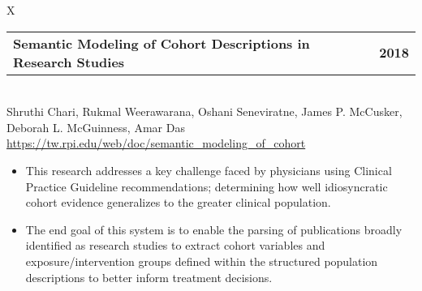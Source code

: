 \documentclass[10pt, letterpaper]{article}
\newcommand{\tabularxwidth}{\textwidth}
\begin{document}
        \begin{minipage}{\tabularxwidth}
        \begin{tabularx}{\tabularxwidth}{X}
            {
                \begin{tabularx}{\tabularxwidth}{@{}X r}
                    \textbf{Semantic Modeling of Cohort Descriptions in Research Studies} &
                    \textbf{
        2018} \\
                \end{tabularx}
            } \\
            Shruthi Chari, Rukmal Weerawarana, Oshani Seneviratne, James P. McCusker, Deborah L. McGuinness, Amar Das \\

            
            
                \url{https://tw.rpi.edu/web/doc/semantic_modeling_of_cohort} \\
            
            
        \end{tabularx}

        \begin{itemize}[noitemsep, topsep=3pt, parsep=0pt, partopsep=0pt]
            
                \item 
    This research addresses a key challenge faced by physicians using Clinical Practice Guideline recommendations; determining how well idiosyncratic cohort evidence generalizes to the greater clinical population.
            
                \item 
    The end goal of this system is to enable the parsing of publications broadly identified as research studies to extract cohort variables and exposure/intervention groups defined within the structured population descriptions to better inform treatment decisions.
            
        \end{itemize}

        

        \end{minipage}
    
\end{document}
